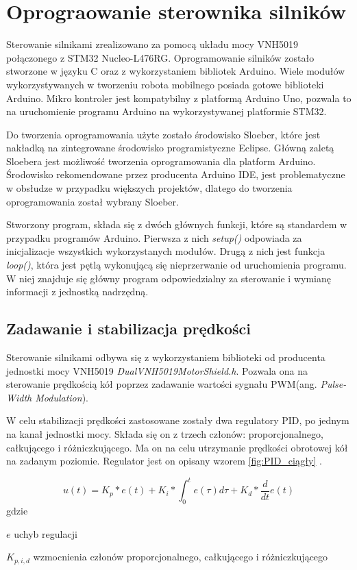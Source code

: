 \chapter{Oprograowanie sterownika silników}

Sterowanie silnikami zrealizowano za pomocą układu mocy VNH5019 połączonego z  STM32 Nucleo-L476RG. Oprogramowanie silników zostało stworzone w języku C oraz z wykorzystaniem bibliotek Arduino. Wiele modułów wykorzystywanych w tworzeniu robota mobilnego posiada gotowe biblioteki Arduino. Mikro kontroler jest kompatybilny z platformą Arduino Uno, pozwala to na uruchomienie programu Arduino na wykorzystywanej platformie STM32.

Do tworzenia oprogramowania użyte zostało środowisko Sloeber, które jest nakładką na zintegrowane środowisko programistyczne Eclipse. Główną zaletą Sloebera jest możliwość tworzenia oprogramowania dla platform Arduino. Środowisko rekomendowane przez producenta Arduino IDE, jest problematyczne w obsłudze w przypadku większych projektów, dlatego do tworzenia oprogramowania został wybrany Sloeber.

Stworzony program, składa się z dwóch głównych funkcji, które są standardem w przypadku programów Arduino. Pierwsza z nich \textit{setup()} odpowiada za inicjalizacje wszystkich wykorzystanych modułów. Drugą z nich jest funkcja \textit{loop()}, która jest  pętlą wykonującą się nieprzerwanie od uruchomienia programu. W niej znajduje się główny program odpowiedzialny za sterowanie i wymianę informacji z jednostką nadrzędną.

\section{Zadawanie i stabilizacja prędkości}

Sterowanie silnikami odbywa się z wykorzystaniem biblioteki od producenta jednostki mocy VNH5019 \textit{DualVNH5019MotorShield.h}. Pozwala ona na sterowanie prędkością kół poprzez zadawanie wartości sygnału PWM(ang. \textit{Pulse-Width Modulation}). 

W celu stabilizacji prędkości zastosowane zostały dwa regulatory PID, po jednym na kanał jednostki mocy.  Składa się on z trzech członów: proporcjonalnego, całkującego i różniczkującego. Ma on na celu utrzymanie prędkości obrotowej kół na zadanym poziomie. Regulator jest on opisany wzorem \ref{fig:PID_ciągły} \cite{pid_continous}.  


\begin{equation}
u(t) = K_p*e(t) + K_i*\int_{0}^{t}e(\tau )d\tau +K_d*\frac{d}{dt}e(t)
\label{fig:PID_ciągły}
\end{equation}
gdzie
\begin{eqwhere}[2cm]
	\item[$e$] uchyb regulacji 
	\item[$K_{p,i,d}$] wzmocnienia członów proporcjonalnego, całkującego i różniczkującego  
\end{eqwhere}

